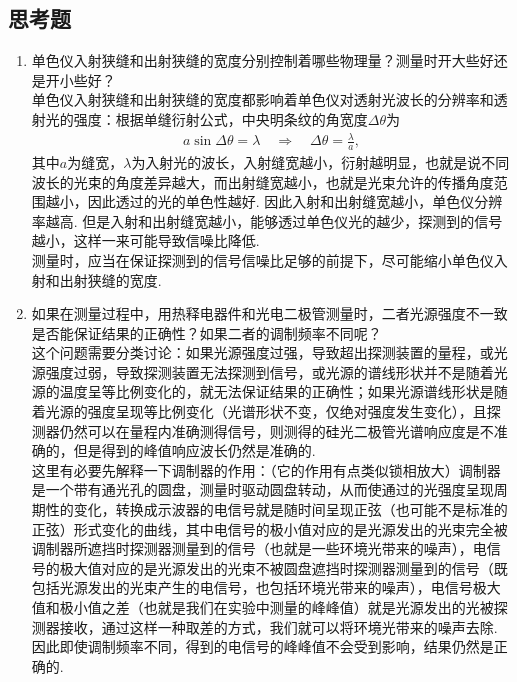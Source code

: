 \documentclass[UTF8,10pt,a4paper]{article}
\begin{document}
\subsection{思考题}
\begin{enumerate}
    \item 单色仪入射狭缝和出射狭缝的宽度分别控制着哪些物理量？测量时开大些好还是开小些好？\\
    单色仪入射狭缝和出射狭缝的宽度都影响着单色仪对透射光波长的分辨率和透射光的强度：根据单缝衍射公式，中央明条纹的角宽度$\Delta\theta$为
    \begin{align}
        a\sin\Delta\theta=\lambda\quad\Longrightarrow\quad\Delta\theta=\frac{\lambda}{a},
    \end{align}
    其中$a$为缝宽，$\lambda$为入射光的波长，入射缝宽越小，衍射越明显，也就是说不同波长的光束的角度差异越大，而出射缝宽越小，也就是光束允许的传播角度范围越小，因此透过的光的单色性越好. 因此入射和出射缝宽越小，单色仪分辨率越高. 但是入射和出射缝宽越小，能够透过单色仪光的越少，探测到的信号越小，这样一来可能导致信噪比降低.\\
    测量时，应当在保证探测到的信号信噪比足够的前提下，尽可能缩小单色仪入射和出射狭缝的宽度.
    \item 如果在测量过程中，用热释电器件和光电二极管测量时，二者光源强度不一致是否能保证结果的正确性？如果二者的调制频率不同呢？\\
    这个问题需要分类讨论：如果光源强度过强，导致超出探测装置的量程，或光源强度过弱，导致探测装置无法探测到信号，或光源的谱线形状并不是随着光源的温度呈等比例变化的，就无法保证结果的正确性；如果光源谱线形状是随着光源的强度呈现等比例变化（光谱形状不变，仅绝对强度发生变化），且探测器仍然可以在量程内准确测得信号，则测得的硅光二极管光谱响应度是不准确的，但是得到的峰值响应波长仍然是准确的.\\
    这里有必要先解释一下调制器的作用：（它的作用有点类似锁相放大）调制器是一个带有通光孔的圆盘，测量时驱动圆盘转动，从而使通过的光强度呈现周期性的变化，转换成示波器的电信号就是随时间呈现正弦（也可能不是标准的正弦）形式变化的曲线，其中电信号的极小值对应的是光源发出的光束完全被调制器所遮挡时探测器测量到的信号（也就是一些环境光带来的噪声），电信号的极大值对应的是光源发出的光束不被圆盘遮挡时探测器测量到的信号（既包括光源发出的光束产生的电信号，也包括环境光带来的噪声），电信号极大值和极小值之差（也就是我们在实验中测量的峰峰值）就是光源发出的光被探测器接收，通过这样一种取差的方式，我们就可以将环境光带来的噪声去除. 因此即使调制频率不同，得到的电信号的峰峰值不会受到影响，结果仍然是正确的.
\end{enumerate}
\end{document}
